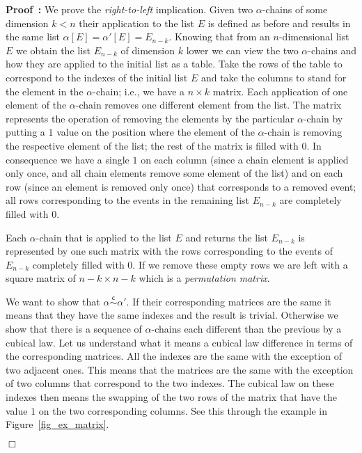 \documentclass[submission,copyright,creativecommons]{eptcs}
\newenvironment{proof}[1][\!\!\,]{\vspace{1ex}\noindent\textbf{Proof #1: }}{\hfill$\Box$\vspace{2ex}}
\newcommand\applyChainList[2]{\ensuremath{#1[#2]}}
\newcommand\chainEquivHDAsculpture{\ensuremath{\overset{\mathsf{c}}{\sim}}}
\begin{document}
\begin{proof}
We prove the \textit{right-to-left} implication.
Given two $\alpha$-chains of some dimension $k<n$ their application to the list $E$ is defined as before and results in the same list $\applyChainList{\alpha}{E}=\applyChainList{\alpha'}{E}=E_{n-k}$. Knowing that from an $n$-dimensional list $E$ we obtain the list $E_{n-k}$ of dimension $k$ lower we can view the two $\alpha$-chains and how they are applied to the initial list as a table. Take the rows of the table to correspond to the indexes of the initial list $E$ and take the columns to stand for the element in the $\alpha$-chain; i.e., we have a $n\times k$ matrix. Each application of one element of the $\alpha$-chain removes one different element from the list. The matrix represents the operation of removing the elements by the particular $\alpha$-chain by putting a $1$ value on the position where the element of the $\alpha$-chain is removing the respective element of the list; the rest of the matrix is filled with $0$. In consequence we have a single $1$  on each column (since a chain element is applied only once, and all chain elements remove some element of the list) and on each row (since an element is removed only once) that corresponds to a removed event; all rows corresponding to the events in the remaining list $E_{n-k}$ are completely filled with $0$. 

Each $\alpha$-chain that is applied to the list $E$ and returns the list $E_{n-k}$ is represented by one such matrix with the rows corresponding to the events of $E_{n-k}$ completely filled with $0$. If we remove these empty rows we are left with a square matrix of $n-k\times n-k$ which is a \textit{permutation matrix}.

We want to show that $\alpha\chainEquivHDAsculpture\alpha'$. If their corresponding matrices are the same it means that they have the same indexes and the result is trivial.
Otherwise we show that there is a sequence of $\alpha$-chains each different than the previous by a cubical law. Let us understand what it means a cubical law difference in terms of the corresponding matrices. All the indexes are the same with the exception of two adjacent ones. This means that the matrices are the same with the exception of two columns that correspond to the two indexes. The cubical law on these indexes then means the swapping of the two rows of the matrix that have the value $1$ on the two corresponding columns.
See this through the example in Figure~\ref{fig_ex_matrix}.




\end{proof}
\end{document}
